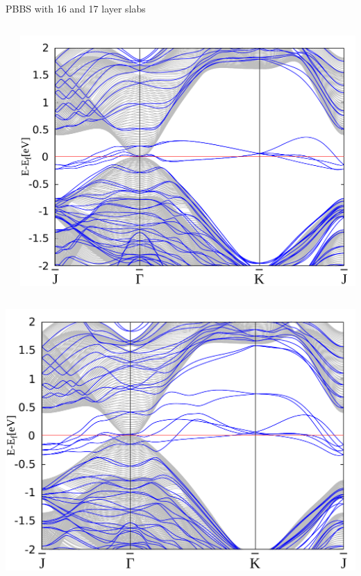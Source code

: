 \begin{frame}{PBBS with 16 and 17 layer slabs}
\begin{columns}
\begin{column}{.34\linewidth}
		\end{column}
		\begin{column}{.34\linewidth}
			\centering 
			\includegraphics[width=\linewidth]{Hg_termination/no_H_bulk+17_layers_no_dos_-2_2.pdf}
		\end{column}
	\end{columns}
	\begin{columns}
		\begin{column}{.34\linewidth}
			\centering
			\includegraphics[width=\linewidth]{Te_and_Hg_termination/bulk+16_layers_no_dos_-2_2.pdf}

\end{column}
\end{columns}
\end{frame}
